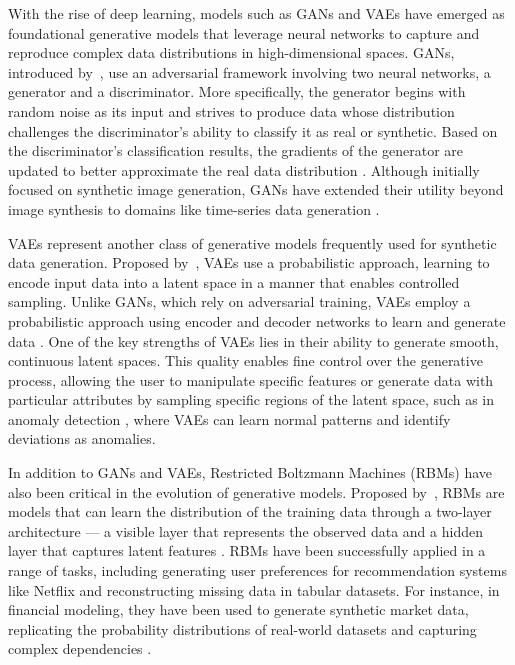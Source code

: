 \documentclass{article}
\begin{document}
With the rise of deep learning, models such as GANs and VAEs have emerged as foundational generative models that leverage neural networks to capture and reproduce complex data distributions in high-dimensional spaces. GANs, introduced by~\cite{goodfellow_generative_2014}, use an adversarial framework involving two neural networks, a generator and a discriminator. More specifically, the generator begins with random noise as its input and strives to produce data whose distribution challenges the discriminator’s ability to classify it as real or synthetic. Based on the discriminator’s classification results, the gradients of the generator are updated to better approximate the real data distribution \parencite{zia_synthetic_2023}. Although initially focused on synthetic image generation, GANs have extended their utility beyond image synthesis to domains like time-series data generation \parencite{yoon_time-series_2019}. 

VAEs represent another class of generative models frequently used for synthetic data generation. Proposed by~\cite{kingma_auto-encoding_2022}, VAEs use a probabilistic approach, learning to encode input data into a latent space in a manner that enables controlled sampling. Unlike GANs, which rely on adversarial training, VAEs  employ a probabilistic approach using encoder and decoder networks to learn and generate data \parencite{lu_machine_2024}. One of the key strengths of VAEs lies in their ability to generate smooth, continuous latent spaces. This quality enables fine control over the generative process, allowing the user to manipulate specific features or generate data with particular attributes by sampling specific regions of the latent space, such as in anomaly detection \parencite{niu_lstm-based_2020}, where VAEs can learn normal patterns and identify deviations as anomalies.

In addition to GANs and VAEs, Restricted Boltzmann Machines (RBMs) have also been critical in the evolution of generative models. Proposed by~\cite{salakhutdinov_restricted_2007}, RBMs are models that can learn the distribution of the training data through a two-layer architecture — a visible layer that represents the observed data and a hidden layer that captures latent features \parencite{carvajal-patino_synthetic_2022}. RBMs have been successfully applied in a range of tasks, including generating user preferences for recommendation systems like Netflix \parencite{nematholahy_recommender_2020} and reconstructing missing data in tabular datasets. For instance, in financial modeling, they have been used to generate synthetic market data, replicating the probability distributions of real-world datasets and capturing complex dependencies \parencite{kondratyev_market_2019}.
\end{document}
